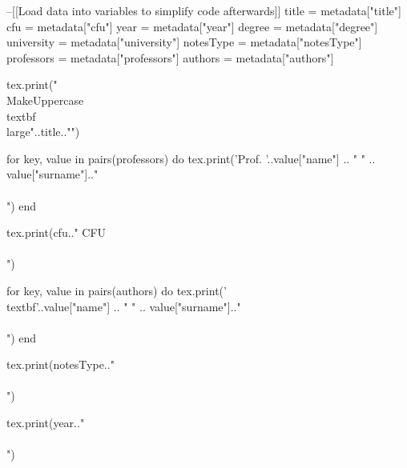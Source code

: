 \ifLuaTeX
\begin{luacode}
--[[Load data into variables to simplify code afterwards]]
title = metadata["title"]
cfu = metadata["cfu"]
year = metadata["year"]
degree = metadata["degree"]
university = metadata["university"]
notesType = metadata["notesType"]
professors = metadata["professors"]
authors = metadata["authors"]
\end{luacode}


\begin{titlepage}
\begin{center}
\vspace*{1em}
\begin{luacode}
		tex.print("\\MakeUppercase{\\textbf{\\large{"..title.."}}}")
\end{luacode}

\vspace{1em}

\begin{luacode}
		for key, value in pairs(professors) do
			 tex.print('Prof. '..value["name"] .. " " .. value["surname"].."\\\\")
		end
\end{luacode}
\begin{luacode}
		tex.print(cfu.." CFU\\\\")
\end{luacode}

\vspace{1em}

\begin{luacode}
		for key, value in pairs(authors) do
			 tex.print('\\textbf{'..value["name"] .. " " .. value["surname"].."}\\\\")
		end
\end{luacode}
                
\vfill
        
\begin{luacode}
		tex.print(notesType.."\\\\")
\end{luacode}
\begin{luacode}
		tex.print(year.."\\\\")
\end{luacode}


\end{center}
\end{titlepage}
